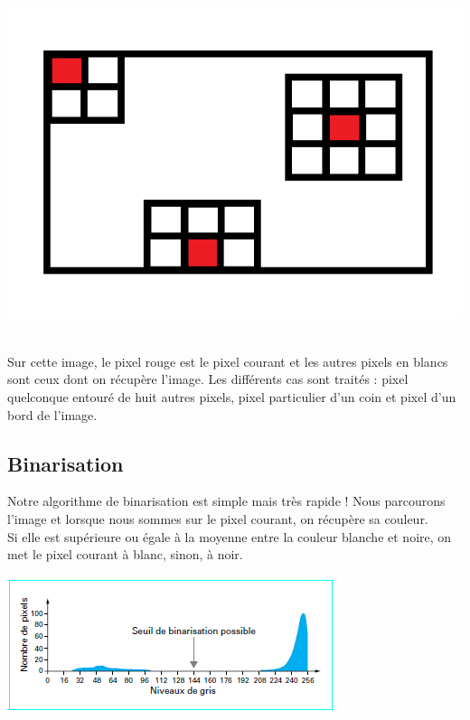 \documentclass [french,12pt]{article}
\begin{document}
\begin{center} \includegraphics[scale=0.4]{a} \end{center}
\\
Sur cette image, le pixel rouge est le pixel courant  et les autres pixels en blancs sont ceux dont on récupère l'image. Les différents cas sont traités : pixel quelconque entouré de huit autres pixels, pixel particulier d'un coin et pixel d'un bord de l'image.


\subsection{Binarisation}

Notre algorithme de binarisation est simple mais très rapide !  Nous parcourons l'image et lorsque nous sommes sur le pixel courant, on récupère sa couleur. \\
Si elle est supérieure ou égale à la moyenne entre la couleur blanche et noire, on met le pixel courant à blanc, sinon, à noir.\\

\begin{center} \includegraphics[scale=1.50]{seuil} \end{center}

\newpage
\end{document}
